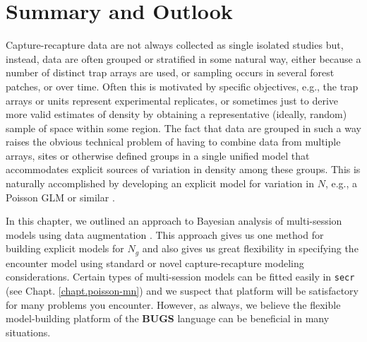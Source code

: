 
\section{Summary and Outlook}

Capture-recapture data are not always collected as single isolated
studies but, instead, data are often grouped or stratified in some
natural way, either because a number of distinct trap arrays are used,
or sampling occurs in several forest patches, or over time. Often this
is motivated by specific objectives, e.g., the trap arrays or units
represent experimental replicates, or sometimes just to derive more
valid estimates of density by obtaining a representative (ideally,
random) sample of space within some region.  The fact that data are
grouped in such a way raises the obvious technical problem of having
to combine data from multiple arrays, sites or otherwise defined
groups in a single unified model that accommodates explicit sources of
variation in density among these groups.  This is naturally
accomplished by developing an explicit model for variation in $N$,
e.g., a Poisson GLM or similar \citep{converse_royle:2012,
  royle_etal:2012arXiv}.

In this chapter, we outlined an approach to Bayesian analysis of
multi-session models using data augmentation
\citet{converse_royle:2012, royle_converse:2013}.  This approach gives
us one method for building explicit models for $N_{g}$
 and also gives us
great flexibility in specifying the encounter model using standard or
novel capture-recapture modeling considerations. Certain types of
multi-session models can be fitted easily in \mbox{\tt secr} (see
Chapt. \ref{chapt.poisson-mn}) and we suspect that platform will be
satisfactory for many problems you encounter. However, as always, we
believe the flexible model-building platform of the {\bf BUGS}
language can be beneficial in many situations.

